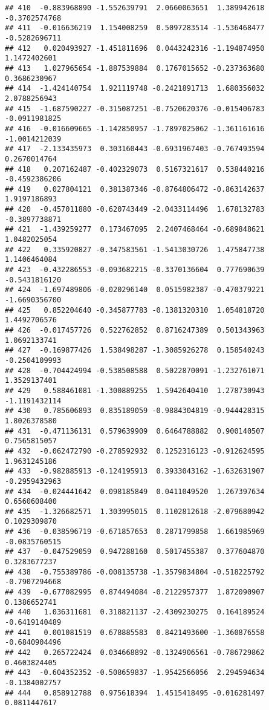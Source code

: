 \documentclass[
]{article}
\begin{document}
\begin{verbatim}
## 410  -0.883968890 -1.552639791  2.0660063651  1.389942618 -0.3702574768
## 411  -0.016636219  1.154008259  0.5097283514 -1.536468477 -0.5282696711
## 412   0.020493927 -1.451811696  0.0443242316 -1.194874950  1.1472402601
## 413   1.027965654 -1.887539884  0.1767015652 -0.237363680  0.3686230967
## 414  -1.424140754  1.921119748 -0.2421891713  1.680356032  2.0788256943
## 415  -1.687590227 -0.315087251 -0.7520620376 -0.015406783 -0.0911981825
## 416  -0.016609665 -1.142850957 -1.7897025062 -1.361161616 -1.0014212039
## 417  -2.133435973  0.303160443 -0.6931967403 -0.767493594  0.2670014764
## 418   0.207162487 -0.402329073  0.5167321617  0.538440216 -0.4592386206
## 419   0.027804121  0.381387346 -0.8764806472 -0.863142637  1.9197186893
## 420  -0.457011880 -0.620743449 -2.0433114496  1.678132783 -0.3897738871
## 421  -1.439259277  0.173467095  2.2407468464 -0.689848621  1.0482025054
## 422   0.335920827 -0.347583561 -1.5413030726  1.475847738  1.1406464084
## 423  -0.432286553 -0.093682215 -0.3370136604  0.777690639 -0.5431816120
## 424  -1.697489806 -0.020296140  0.0515982387 -0.470379221 -1.6690356700
## 425   0.852204640 -0.345877783 -0.1381320310  1.054818720  1.4492706576
## 426  -0.017457726  0.522762852  0.8716247389  0.501343963  1.0692133741
## 427  -0.169877426  1.538498287 -1.3085926278  0.158540243 -0.2504109993
## 428  -0.704424994 -0.538508588  0.5022870091 -1.232761071  1.3529137401
## 429   0.588461081 -1.300889255  1.5942640410  1.278730943 -1.1191432114
## 430   0.785606893  0.835189059 -0.9884304819 -0.944428315  1.8026378580
## 431  -0.471136131  0.579639909  0.6464788882  0.900140507  0.7565815057
## 432  -0.062472790 -0.278592932  0.1252316123 -0.912624595  1.9631245186
## 433  -0.982885913 -0.124195913  0.3933043162 -1.632631907 -0.2959432963
## 434  -0.024441642  0.098185849  0.0411049520  1.267397634  0.6560608400
## 435  -1.326682571  1.303995015  0.1102812618 -2.079680942  0.1029309870
## 436  -0.038596719 -0.671857653  0.2871799858  1.661985969 -0.0835760515
## 437  -0.047529059  0.947288160  0.5017455387  0.377604870  0.3283677237
## 438  -0.755389786 -0.008135738 -1.3579834804 -0.518225792 -0.7907294668
## 439  -0.677082995  0.874494084 -0.2122957377  1.872090907  0.1386652741
## 440   1.036311681  0.318821137 -2.4309230275  0.164189524 -0.6419140489
## 441   0.001081519  0.678885583  0.8421493600 -1.360876558 -0.6840904496
## 442   0.265722424  0.034668892 -0.1324906561 -0.786729862  0.4603824405
## 443  -0.604352352 -0.508659837 -1.9542566056  2.294594634 -0.1384002757
## 444   0.858912788  0.975618394  1.4515418495 -0.016281497  0.0811447617

\end{verbatim}
\end{document}
